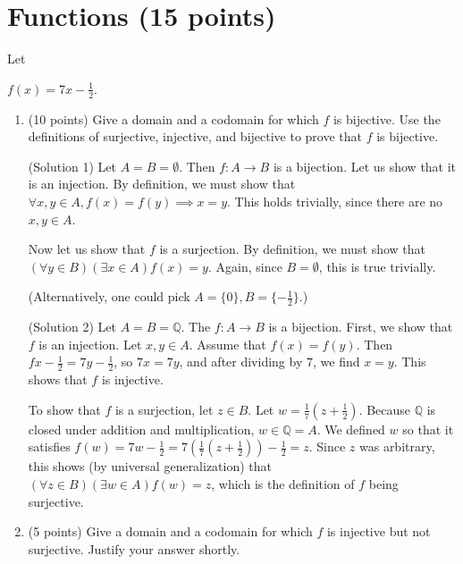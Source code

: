 \documentclass[11pt]{article}
\def\sectionOneA#1{}
\def\sectionOneB#1{}
\def\sectionTwoA#1{}
\def\sectionTwoB#1{}
\def\sectionVicsection#1{#1}
\newcounter{pgpts}
\newcounter{cumpts}
\newcommand{\cnewpage}{\addtocounter{cumpts}{\value{pgpts}}\newpage\setcounter{pgpts}{0}}
\begin{document}


\section{Functions (15 points)}\addtocounter{pgpts}{15}


Let
\sectionOneA{$f(x)=\frac{x-1}{3}$\;.}
\sectionOneB{$f(x)=\frac{x-1}{2}$\;.} %
\sectionTwoA{$f(x)=5x+2$\;.}
\sectionTwoB{$f(x)=2x+5$\;.} %
\sectionVicsection{$f(x)=7x-\frac{1}{2}$\;.}
  \begin{enumerate}
    \item (10 points) Give a domain and a codomain for which $f$ is bijective. Use the definitions of surjective, injective, and bijective to prove that $f$ is bijective.
       \vspace*{1cm}

    (Solution 1) Let $A=B=\emptyset$. Then $f:A\to B$ is a bijection.
    Let us show that it is an injection. By definition, we must show that $\forall x,y \in A, f(x)=f(y) \implies x =y$. This holds trivially, since there are no $x,y\in A$.

    Now let us show that $f$ is a surjection. By definition, we must show that $(\forall y \in B)(\exists x\in A) f(x)=y$. Again, since $B=\emptyset$, this is true trivially.

    (Alternatively, one could pick $A = \{0\}, B=\{-\frac{1}{2}\}$.)

    \vspace*{1cm}
    
    (Solution 2) Let $A=B=\mathbb{Q}$. The $f:A\to B$ is a bijection. First, we show that $f$ is an injection. Let $x,y\in A$. Assume that $f(x)=f(y)$. Then $fx-\frac{1}{2}=7y-\frac{1}{2}$, so $7x=7y$, and after dividing by $7$, we find $x=y$. This shows that $f$ is injective.

    To show that $f$ is a surjection, let $z\in B$. Let $w=\frac{1}{7}(z+\frac{1}{2})$. Because $\mathbb{Q}$ is closed under addition and multiplication, $w\in \mathbb{Q}=A$. We defined $w$ so that it satisfies $f(w)= 7w-\frac{1}{2} = 7(\frac{1}{7}(z+\frac{1}{2}))-\frac{1}{2} =z$. Since $z$ was arbitrary, this shows (by universal generalization) that $(\forall z \in B)(\exists w\in A) f(w)=z$, which is the definition of $f$ being surjective.

    \vspace*{1cm}
    \item (5 points) Give a domain and a codomain for which $f$ is injective but not surjective. Justify your answer shortly.


\end{enumerate}
\end{document}
